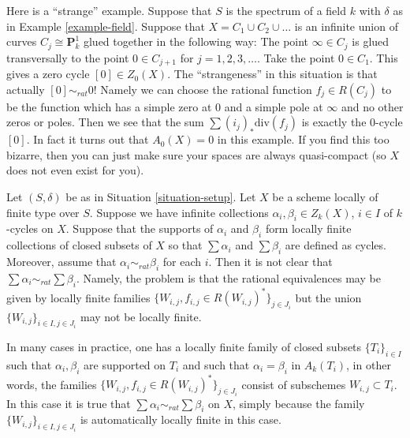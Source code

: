 \begin{example}
\label{example-weird}
Here is a ``strange'' example.
Suppose that $S$ is the spectrum of a field $k$
with $\delta$ as in Example \ref{example-field}.
Suppose that $X = C_1 \cup C_2 \cup \ldots$ is an infinite
union of curves $C_j \cong \mathbf{P}^1_k$ glued together
in the following way: The point $\infty \in C_j$ is glued
transversally to the point $0 \in C_{j + 1}$ for $j = 1, 2, 3, \ldots$.
Take the point $0 \in C_1$. This gives a zero cycle
$[0] \in Z_0(X)$. The ``strangeness'' in this situation is
that actually $[0] \sim_{rat} 0$! Namely we can choose
the rational function $f_j \in R(C_j)$ to be the function
which has a simple zero at $0$ and a simple pole at $\infty$
and no other zeros or poles. Then we see that the sum
$\sum (i_j)_*\text{div}(f_j)$ is exactly the $0$-cycle
$[0]$. In fact it turns out that $A_0(X) = 0$ in this example.
If you find this too bizarre, then you can just
make sure your spaces are always quasi-compact
(so $X$ does not even exist for you).
\end{example}

\begin{remark}
\label{remark-infinite-sums-rational-equivalences}
Let $(S, \delta)$ be as in Situation \ref{situation-setup}.
Let $X$ be a scheme locally of finite type over $S$.
Suppose we have infinite collections $\alpha_i, \beta_i \in Z_k(X)$,
$i \in I$ of $k$-cycles on $X$. Suppose that the supports
of $\alpha_i$ and $\beta_i$ form locally finite collections
of closed subsets of $X$ so that $\sum \alpha_i$
and $\sum \beta_i$ are defined as cycles. Moreover, assume that
$\alpha_i \sim_{rat} \beta_i$ for each $i$. Then it is not
clear that $\sum \alpha_i \sim_{rat} \sum \beta_i$. Namely,
the problem is that the rational equivalences may be
given by locally finite
families $\{W_{i, j}, f_{i, j} \in R(W_{i, j})^*\}_{j \in J_i}$
but the union $\{W_{i, j}\}_{i \in I, j\in J_i}$ may not
be locally finite.

\medskip\noindent
In many cases in practice, one has a locally finite family of closed
subsets $\{T_i\}_{i \in I}$ such that $\alpha_i, \beta_i$
are supported on $T_i$ and such that $\alpha_i = \beta_i$
in $A_k(T_i)$, in other words, the families
$\{W_{i, j}, f_{i, j} \in R(W_{i, j})^*\}_{j \in J_i}$
consist of subschemes $W_{i, j} \subset T_i$. In this case it is true that
$\sum \alpha_i \sim_{rat} \sum \beta_i$ on $X$, simply because
the family $\{W_{i, j}\}_{i \in I, j\in J_i}$ is automatically
locally finite in this case.
\end{remark}






